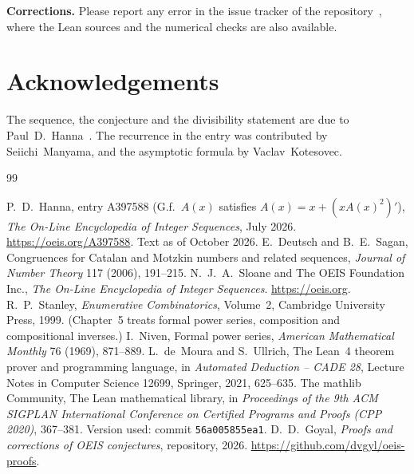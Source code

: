 \documentclass[11pt,a4paper]{article}
\theoremstyle{definition}
\theoremstyle{remark}
\newcommand{\para}[1]{\par\medskip\noindent\textbf{#1}\enspace}
\begin{document}
\para{Corrections.} Please report any error in the issue tracker of the repository~\cite{repo}, where the Lean sources and the numerical checks are also
available.

\section*{Acknowledgements}
The sequence, the conjecture and the divisibility statement are due to Paul~D.~Hanna~\cite{oeis}. The recurrence in the
entry was contributed by Seiichi~Manyama, and the asymptotic formula by Vaclav~Kotesovec.

\begin{thebibliography}{99}\small
\raggedright
{} P.~D.~Hanna, entry A397588 (G.f.\ $A(x)$ satisfies $A(x)=x+(xA(x)^2)'$), \emph{The On-Line Encyclopedia of Integer Sequences}, July 2026. \url{https://oeis.org/A397588}. Text as of October 2026.
 E.~Deutsch and B.~E.~Sagan, Congruences for Catalan and Motzkin numbers and related sequences, \emph{Journal of Number Theory} 117 (2006), 191--215.
 N.~J.~A.~Sloane and The OEIS Foundation Inc., \emph{The On-Line Encyclopedia of Integer Sequences}. \url{https://oeis.org}.
 R.~P.~Stanley, \emph{Enumerative Combinatorics}, Volume~2, Cambridge University Press, 1999. (Chapter~5 treats formal power series, composition and compositional inverses.)
 I.~Niven, Formal power series, \emph{American Mathematical Monthly} 76 (1969), 871--889.
 L.~de~Moura and S.~Ullrich, The Lean~4 theorem prover and programming language, in \emph{Automated Deduction -- CADE 28}, Lecture Notes in Computer Science 12699, Springer, 2021, 625--635.
 The mathlib Community, The Lean mathematical library, in \emph{Proceedings of the 9th ACM SIGPLAN International Conference on Certified Programs and Proofs (CPP 2020)}, 367--381. Version used: commit \texttt{56a005855ea1}.
 D.~D.~Goyal, \emph{Proofs and corrections of OEIS conjectures}, repository, 2026. \url{https://github.com/dvgyl/oeis-proofs}.
\end{thebibliography}
\end{document}
